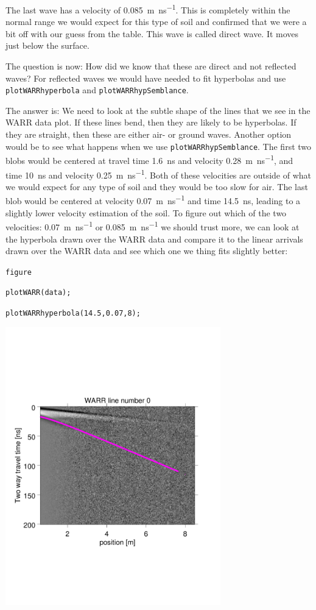 \documentclass[11pt]{article}
\begin{document}
The last wave has a velocity of \SI{0.085}{m\per\ns}. This is
completely within the normal range we would expect for this type of
soil and confirmed that we were a bit off with our guess from the
table. This wave is called direct wave. It moves just below the
surface.

The question is now: How did we know that these are direct and not
reflected waves? For reflected waves we would have needed to fit
hyperbolas and use \verb#plotWARRhyperbola# and \linebreak
\verb#plotWARRhypSemblance#.

The answer is: We need to look at the subtle shape of the lines that
we see in the WARR data plot. If these lines bend, then they are
likely to be hyperbolas. If they are straight, then these are either
air- or ground waves. Another option would be to see what happens
when we use \verb#plotWARRhypSemblance#.  The first two blobs would be
centered at travel time \SI{1.6}{\ns} and velocity
\SI{0.28}{m\per\ns}, and time \SI{10}{ns} and velocity
\SI{0.25}{m\per\ns}. Both of these velocities are outside of what we
would expect for any type of soil and they would be too slow for
air. The last blob would be centered at velocity \SI{0.07}{m\per\ns}
and time \SI{14.5}{\ns}, leading to a slightly lower velocity
estimation of the soil. To figure out which of the two velocities:
\SI{0.07}{m\per\ns} or \SI{0.085}{m\per\ns} we should trust more, we
can look at the hyperbola drawn over the WARR data and compare it to
the linear arrivals drawn over the WARR data and see which one we
thing fits slightly better:

\qquad \verb#figure#

\qquad \verb#plotWARR(data);#

\qquad \verb#plotWARRhyperbola(14.5,0.07,8);#

\begin{center}
  \includegraphics[width=0.7\textwidth,trim = 0.9cm 6cm 2cm
    6.5cm,clip]{figures/WARRhyperb}
\end{center}
\end{document}
